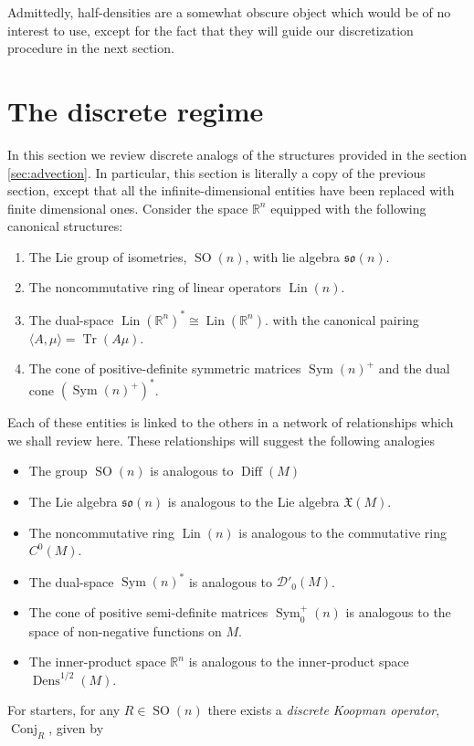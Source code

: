 \documentclass[12pt]{amsart}
\newcommand{\R}{\ensuremath{\mathbb{R}}}
\DeclareMathOperator{\Diff}{Diff}
\DeclareMathOperator{\Dens}{Dens}
\DeclareMathOperator{\SO}{SO}
\DeclareMathOperator{\Sym}{Sym}
\DeclareMathOperator{\Lin}{Lin}
\DeclareMathOperator{\Tr}{Tr}
\DeclareMathOperator{\Conj}{Conj}
\begin{document}
Admittedly, half-densities are a somewhat obscure object which would be of no interest to use, except for the fact that they will guide
our discretization procedure in the next section.

\section{The discrete regime}
\label{sec:discrete}
In this section we review discrete analogs of the structures provided in the section \ref{sec:advection}.
In particular, this section is literally a copy of the previous section, except that all the infinite-dimensional entities have been replaced with finite dimensional ones.
Consider the space $\R^n$ equipped with the following canonical structures:
\begin{enumerate}
	\item The Lie group of isometries, $\SO(n)$, with lie algebra $\mathfrak{so}(n)$.
	\item The noncommutative ring of linear operators $\Lin(n)$.
	\item The dual-space $\Lin(\R^n)^* \cong \Lin(\R^n)$.
	with the canonical pairing $\langle A , \mu \rangle = \Tr(A \mu)$.
	\item The cone of positive-definite symmetric matrices $\Sym(n)^+$ and the dual cone $(\Sym(n)^+)^*$.
\end{enumerate}
Each of these entities is linked to the others in a network of relationships
which we shall review here.
These relationships will suggest the following analogies
\begin{itemize}
	\item The group $\SO(n)$ is analogous to $\Diff(M)$
	\item The Lie algebra $\mathfrak{so}(n)$ is analogous to the Lie algebra $\mathfrak{X}(M)$.
	\item The noncommutative ring $\Lin(n)$ is analogous to the commutative ring $C^0(M)$.
	\item The dual-space $\Sym(n)^*$ is analogous to $\mathcal{D}'_0(M)$.
	\item The cone of positive semi-definite matrices $\Sym_0^+(n)$ is analogous to the space of non-negative functions on $M$.
	\item The inner-product space $\R^n$ is analogous to the inner-product space $\Dens^{1/2}(M)$.
\end{itemize}
For starters, for any $R \in \SO(n)$ there exists a \emph{discrete Koopman operator},$\Conj_R$, given by
\end{document}
